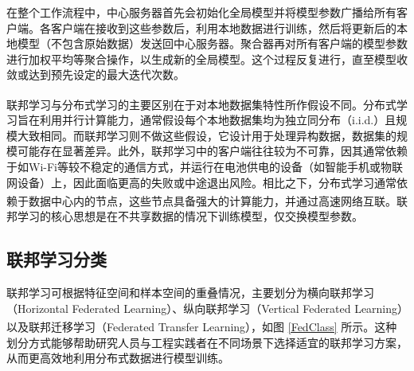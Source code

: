 在整个工作流程中，中心服务器首先会初始化全局模型并将模型参数广播给所有客户端。各客户端在接收到这些参数后，利用本地数据进行训练，然后将更新后的本地模型（不包含原始数据）发送回中心服务器。聚合器再对所有客户端的模型参数进行加权平均等聚合操作，以生成新的全局模型。这个过程反复进行，直至模型收敛或达到预先设定的最大迭代次数。

联邦学习与分布式学习的主要区别在于对本地数据集特性所作假设不同\textsuperscript{\cite{konevcny2015federated}}。分布式学习旨在利用并行计算能力，通常假设每个本地数据集均为独立同分布（i.i.d.）且规模大致相同。而联邦学习则不做这些假设，它设计用于处理异构数据，数据集的规模可能存在显著差异。此外，联邦学习中的客户端往往较为不可靠，因其通常依赖于如Wi-Fi等较不稳定的通信方式，并运行在电池供电的设备（如智能手机或物联网设备）上，因此面临更高的失败或中途退出风险。相比之下，分布式学习通常依赖于数据中心内的节点，这些节点具备强大的计算能力，并通过高速网络互联\textsuperscript{\cite{kairouz2021advances}}。联邦学习的核心思想是在不共享数据的情况下训练模型，仅交换模型参数。

\subsection{联邦学习分类}
联邦学习可根据特征空间和样本空间的重叠情况，主要划分为横向联邦学习（Horizontal Federated Learning）、纵向联邦学习（Vertical Federated Learning）以及联邦迁移学习（Federated Transfer Learning）\textsuperscript{\cite{yang2019federated,li2020federated}}，如图 \ref{FedClass} 所示。这种划分方式能够帮助研究人员与工程实践者在不同场景下选择适宜的联邦学习方案，从而更高效地利用分布式数据进行模型训练。

